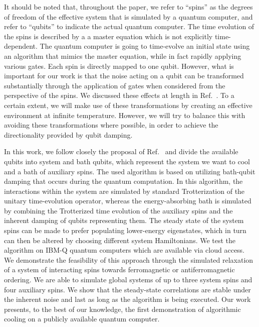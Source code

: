 \documentclass[twocolumn,amsmath,amssymb,pra]{revtex4-2}
\begin{document}
It should be noted that, throughout the paper, we refer to ``spins'' as the degrees of freedom of the effective system that is simulated
by a quantum computer, and refer to ``qubits'' to indicate the actual quantum computer. The time evolution of the spins is described by a 
a master equation which is not explicitly time-dependent. The quantum computer is going to time-evolve an initial state using an algorithm
that mimics the master equation, while in fact rapidly applying various gates. Each spin is directly mapped to one qubit. However,
what is important for our work is that the noise acting on a qubit can be transformed substantially through the application of gates when considered
from the perspective of the spins. We discussed these effects at length in Ref.~\cite{Fratus2022}. To a certain extent, we will make use of these transformations
by creating an effective environment at infinite temperature. However, we will try to balance this with avoiding these transformations where possible, in order to achieve the directionality
provided by qubit damping.

In this work, we follow closely the proposal of Ref.~\cite{Leppakangas2023} and divide the available qubits into system and bath qubits,
which represent the system we want to cool and a bath of auxiliary spins.
The used algorithm is based on utilizing bath-qubit damping that occurs during the quantum computation.
In this algorithm,
the interactions within the system are simulated by standard Trotterization of the unitary time-evolution operator,
whereas the energy-absorbing bath is simulated by combining the Trotterized time evolution of the auxiliary spins and the inherent damping of qubits representing them.
The steady state of the system spins can be made to prefer populating lower-energy eigenstates, which in turn
can then be altered by choosing different system Hamiltonians.
We test the algorithm on IBM-Q quantum computers which are available via cloud access.
We demonstrate the feasibility of this approach 
through the simulated relaxation of a system of interacting spins towards ferromagnetic or antiferromagnetic ordering.
We are able to simulate global systems of up to three system spins and four auxiliary spins.
We show that the steady-state correlations are stable under the inherent noise and last as long as the algorithm is being executed.
Our work presents, to the best of our knowledge, the first demonstration of algorithmic cooling on a publicly available quantum computer.
\end{document}
